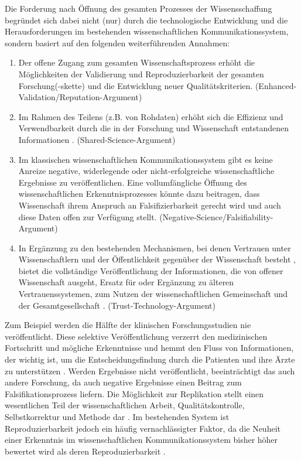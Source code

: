 Die Forderung nach Öffnung des gesamten Prozesses der Wissensschaffung begründet sich dabei nicht (nur) durch die technologische Entwicklung und die Herausforderungen im bestehenden wissenschaftlichen Kommunikationssystem, sondern basiert auf den folgenden weiterführenden Annahmen:
\begin{enumerate}
\item Der offene Zugang zum gesamten Wissenschaftsprozess erhöht die Möglichkeiten der Validierung und Reproduzierbarkeit der gesamten Forschung(-skette) \cite{Nosek_2015} \cite{Aleksic_2014} \cite{Krumholz_2014} \cite{Hey_2015} und die Entwicklung neuer Qualitätskriterien. (Enhanced-Validation/Reputation-Argument)
\item Im Rahmen des Teilens (z.B. von Rohdaten) erhöht sich die Effizienz und Verwendbarkeit durch die in der Forschung und Wissenschaft entstandenen Informationen \cite{Fecher_2015}. (Shared-Science-Argument)
\item Im klassischen wissenschaftlichen Kommunikationssystem gibt es keine Anreize negative, widerlegende oder nicht-erfolgreiche wissenschaftliche Ergebnisse zu veröffentlichen. Eine vollumfängliche Öffnung des wissenschaftlichen Erkenntnisprozesses könnte dazu beitragen, dass Wissenschaft ihrem Anspruch an Falsifizierbarkeit gerecht wird und auch diese Daten offen zur Verfügung stellt. (Negative-Science/Falsifiability-Argument)
\item In Ergänzung zu den bestehenden Mechanismen, bei denen Vertrauen unter Wissenschaftlern und der Öffentlichkeit gegenüber der Wissenschaft besteht \cite{Weingart_2005}, bietet die vollständige Veröffentlichung der Informationen, die von offener Wissenschaft ausgeht, Ersatz für oder Ergänzung zu älteren Vertrauenssystemen, zum Nutzen der wissenschaftlichen Gemeinschaft und der Gesamtgesellschaft \cite{Grand_2012}. (Trust-Technology-Argument)
\end{enumerate}

Zum Beispiel werden die Hälfte der klinischen Forschungsstudien nie veröffentlicht. Diese selektive Veröffentlichung verzerrt den medizinischen Fortschritt und mögliche Erkenntnisse und hemmt den Fluss von Informationen, der wichtig ist, um die Entscheidungsfindung durch die Patienten und ihre Ärzte zu unterstützen \cite{Ross_2013}. Werden Ergebnisse nicht veröffentlicht, beeinträchtigt das auch andere Forschung, da auch negative Ergebnisse einen Beitrag zum Falsifikationsprozess liefern. Die Möglichkeit zur Replikation stellt einen wesentlichen Teil der wissenschaftlichen Arbeit, Qualitätskontrolle, Selbstkorrektur und Methode dar \cite{Nosek_2015}. Im bestehenden System ist Reproduzierbarkeit jedoch ein häufig vernachlässigter Faktor, da die Neuheit einer Erkenntnis im wissenschaftlichen Kommunikationssystem bisher höher bewertet wird als deren Reproduzierbarkeit \cite{Nosek_2015}.

